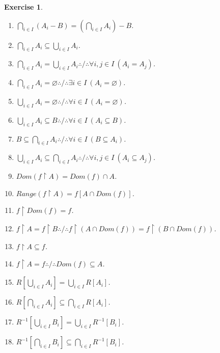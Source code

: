 \documentclass[10pt,a4paper]{book}
\newtheorem{exercise}{Exercise}[section]
\begin{document}
\begin{exercise}
\begin{enumerate}
        \item $\bigcap_{i\in I}(A_i- B)
                  =\left(\bigcap_{i\in I}A_i\right)- B$.
        \item $\bigcap_{i\in I}A_i\subseteq\bigcup_{i\in I}A_i$.
        \item $\bigcap_{i\in I}A_i=\bigcup_{i\in I}A_i
                  \therefore / \therefore \forall i,j\in I\ (A_i=A_j)$.
        \item $\bigcap_{i\in I}A_i=\varnothing
                  \therefore / \therefore \exists i\in I\ (A_i=\varnothing)$.
        \item $\bigcup_{i\in I}A_i=\varnothing
                  \therefore / \therefore \forall i\in I\ (A_i=\varnothing)$.
        \item $\bigcup_{i\in I}A_i\subseteq B
                  \therefore / \therefore \forall i\in I\ (A_i\subseteq B)$.
        \item $B\subseteq\bigcap_{i\in I}A_i
                  \therefore / \therefore \forall i\in I\ (B\subseteq A_i)$.
        \item $\bigcup_{i\in I}A_i\subseteq\bigcap_{i\in I}A_i
                  \therefore / \therefore \forall i,j\in I\ (A_i\subseteq A_j)$.
        \item $Dom(f\upharpoonright A)=Dom(f)\cap A$.
        \item $Range(f\upharpoonright A)=f[A\cap Dom(f)]$.
        \item $f\upharpoonright Dom(f)=f$.
        \item $f\upharpoonright A=f\upharpoonright B \therefore / \therefore f\upharpoonright(A\cap Dom(f))=f\upharpoonright(B\cap Dom(f))$.
        \item $f\upharpoonright A\subseteq f$.
        \item $f\upharpoonright A=f \therefore / \therefore Dom(f)\subseteq A$.


        \item $R\left[\bigcup_{i\in I}A_i\right]
                  =\bigcup_{i\in I}R[A_i]$.

        \item $R\left[\bigcap_{i\in I}A_i\right]
                  \subseteq\bigcap_{i\in I}R[A_i]$.

        \item $R^{-1}\left[\bigcup_{i\in I}B_i\right]
                  =\bigcup_{i\in I}R^{-1}[B_i]$.

        \item $R^{-1}\left[\bigcap_{i\in I}B_i\right]
                  \subseteq\bigcap_{i\in I}R^{-1}[B_i]$.




\end{enumerate}
\end{exercise}
\end{document}
